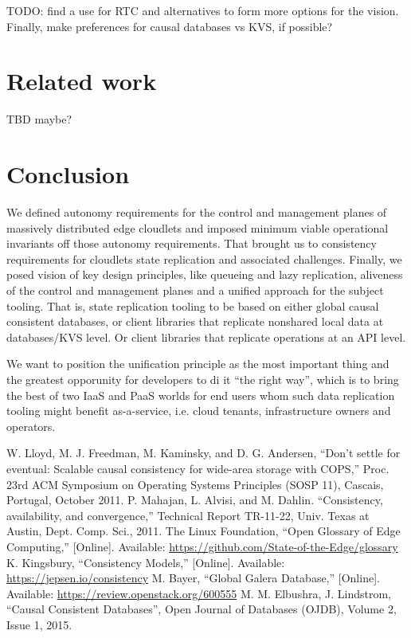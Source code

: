\documentclass[conference]{IEEEtran}
\begin{document}
TODO: find a use for RTC and\cite{b6} alternatives to form more
options for the vision. Finally, make preferences for causal databases vs KVS, if
possible?

\section{Related work}

TBD maybe?

\section{Conclusion}

We defined autonomy requirements for the control and management planes of
massively distributed edge cloudlets and imposed minimum viable operational
invariants off those autonomy requirements. That brought us to consistency
requirements for cloudlets state replication and associated challenges.
Finally, we posed vision of key design principles, like queueing and lazy
replication, aliveness of the control and management planes and a unified
approach for the subject tooling. That is, state replication tooling to be
based on either global causal consistent databases, or client libraries that
replicate nonshared local data at databases/KVS level. Or client libraries that
replicate operations at an API level.

We want to position the unification principle as the most important thing and the
greatest opporunity for developers to di it ``the right way'', which is to bring the best of
two IaaS and PaaS worlds for end users whom such data replication tooling might
benefit as-a-service, i.e. cloud tenants, infrastructure owners and operators.

\begin{thebibliography}{00}
 W. Lloyd, M. J. Freedman, M. Kaminsky, and D. G. Andersen, ``Don’t settle for eventual: Scalable causal consistency for wide-area storage with COPS,'' Proc. 23rd ACM Symposium on Operating Systems Principles (SOSP 11), Cascais, Portugal, October 2011.
 P. Mahajan, L. Alvisi, and M. Dahlin. ``Consistency, availability, and convergence,'' Technical Report TR-11-22, Univ. Texas at Austin, Dept. Comp. Sci., 2011.
 The Linux Foundation, ``Open Glossary of Edge Computing,'' [Online]. Available: \url{https://github.com/State-of-the-Edge/glossary}
 K. Kingsbury, ``Consistency Models,'' [Online]. Available: \url{https://jepsen.io/consistency}
 M. Bayer, ``Global Galera Database,'' [Online]. Available: \url{https://review.openstack.org/600555}
 M. M. Elbushra, J. Lindstrom, ``Causal Consistent Databases'', Open Journal of Databases (OJDB), Volume 2, Issue 1, 2015.
\end{thebibliography}
\end{document}
